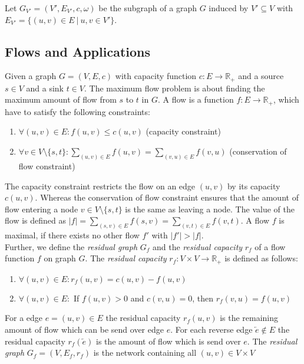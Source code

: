 \begin{definition}
Let $G_{V'} = (V',E_{V'},c,\omega)$ be the subgraph of a graph $G$
induced by $V' \subseteq V$ with $E_{V'} = \{(u,v) \in E\ |\ u,v \in V'\}$.
\label{def:subgraph}
\end{definition}


\subsection{Flows and Applications}
\label{sec:applications}

Given a graph $G = (V,E,c)$ with capacity function $c: E \rightarrow \mathbb{R}_+$ and a source 
$s \in V$ and a sink $t \in V$. The maximum flow problem is about finding 
the maximum amount of flow from $s$ to $t$ in $G$. A flow is a function 
$f: E \rightarrow \mathbb{R}_+$, which have to satisfy the following constraints:
\begin{enumerate}
\item $\forall (u,v) \in E: f(u,v) \le c(u,v)$ (capacity constraint)
\item $\forall v \in V \setminus \{s,t\}: \sum_{(u,v) \in E} f(u,v) = \sum_{(v,u) \in E} f(v,u)$ (conservation of flow constraint)
\end{enumerate}
The capacity constraint restricts the flow on an edge $(u,v)$ by its capacity 
$c(u,v)$. Whereas the conservation of flow constraint ensures that the amount
of flow entering a node $v \in V \setminus \{s,t\}$ is the same as leaving a node.
The value of the flow is defined as $|f| = \sum_{(s,v) \in E} f(s,v) = \sum_{(v,t) \in E} f(v,t)$.
A flow $f$ is maximal, if there exists no other flow $f'$ with $|f'| > |f|$. \\
Further, we define the \emph{residual graph} $G_f$ and the 
\emph{residual capacity} $r_f$ of a flow function $f$ on graph $G$.
The \emph{residual capacity} $r_f: V \times V \rightarrow \mathbb{R}_+$ is defined as follows:
\begin{enumerate}
\item $\forall (u,v) \in E: r_f(u,v) = c(u,v) - f(u,v)$
\item $\forall (u,v) \in E:$ If $f(u,v) > 0$ and $c(v,u) = 0$, then $r_f(v,u) = f(u,v)$
\end{enumerate}
For a edge $e = (u,v) \in E$ the residual capacity $r_f(u,v)$ is the remaining amount of 
flow which can be send over edge $e$. For each reverse edge $\overleftarrow{e} \notin E$ the
residual capacity $r_f(\overleftarrow{e})$ is the amount of flow which is send over $e$.
The \emph{residual graph} $G_f = (V,E_f,r_f)$ is the network containing all $(u,v) \in V \times V$
